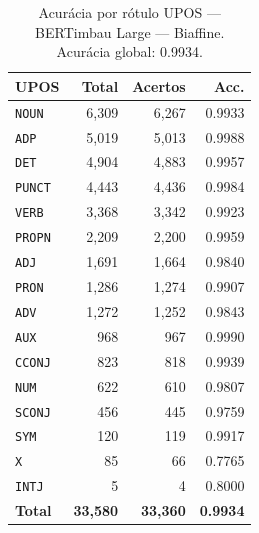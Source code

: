 \begin{table}[ht]
\centering
\footnotesize
\begin{tabular}{lrrr}
\toprule
\textbf{UPOS} & \textbf{Total} & \textbf{Acertos} & \textbf{Acc.} \\
\midrule
\texttt{NOUN} & 6,309 & 6,267 & 0.9933 \\
\texttt{ADP} & 5,019 & 5,013 & 0.9988 \\
\texttt{DET} & 4,904 & 4,883 & 0.9957 \\
\texttt{PUNCT} & 4,443 & 4,436 & 0.9984 \\
\texttt{VERB} & 3,368 & 3,342 & 0.9923 \\
\texttt{PROPN} & 2,209 & 2,200 & 0.9959 \\
\texttt{ADJ} & 1,691 & 1,664 & 0.9840 \\
\texttt{PRON} & 1,286 & 1,274 & 0.9907 \\
\texttt{ADV} & 1,272 & 1,252 & 0.9843 \\
\texttt{AUX} & 968 & 967 & 0.9990 \\
\texttt{CCONJ} & 823 & 818 & 0.9939 \\
\texttt{NUM} & 622 & 610 & 0.9807 \\
\texttt{SCONJ} & 456 & 445 & 0.9759 \\
\texttt{SYM} & 120 & 119 & 0.9917 \\
\texttt{X} & 85 & 66 & 0.7765 \\
\texttt{INTJ} & 5 & 4 & 0.8000 \\
\midrule
\textbf{Total} & \textbf{33,580} & \textbf{33,360} & \textbf{0.9934} \\
\bottomrule
\end{tabular}
\caption{Acurácia por rótulo UPOS — BERTimbau Large — Biaffine. Acurácia global: 0.9934.}
\label{tab:upos-acc-predict-test-df-bertimbau-large-biaffine}
\end{table}


